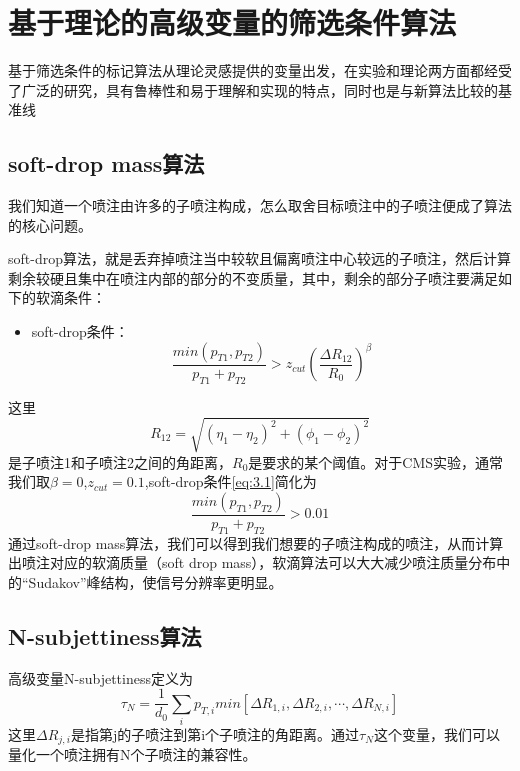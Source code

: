 \section{基于理论的高级变量的筛选条件算法}
基于筛选条件的标记算法从理论灵感提供的变量出发，在实验和理论两方面都经受了广泛的研究，具有鲁棒性和易于理解和实现的特点，同时也是与新算法比较的基准线
\subsection{soft-drop mass算法}
我们知道一个喷注由许多的子喷注构成，怎么取舍目标喷注中的子喷注便成了算法的核心问题。

soft-drop算法，就是丢弃掉喷注当中较软且偏离喷注中心较远的子喷注，然后计算剩余较硬且集中在喷注内部的部分的不变质量，其中，剩余的部分子喷注要满足如下的软滴条件：
\begin{itemize}
    \item soft-drop条件：
    \begin{equation}\label{eq:3.1}
        \frac{min(p_{T1}, p_{T2})}{p_{T1}+p_{T2}}>z_{cut} \left(\frac{\Delta R_{12}}{R_0}\right)^\beta
    \end{equation}
\end{itemize}
这里
\begin{equation}\label{eq:3.2}
    R_{12}=\sqrt{(\eta_1-\eta_2)^2+(\phi_1-\phi_2)^2}
\end{equation}
是子喷注1和子喷注2之间的角距离，$R_0$是要求的某个阈值。对于CMS实验，通常我们取$\beta=0$,$z_{cut}=0.1$,soft-drop条件\eqref{eq:3.1}简化为
\begin{equation}
    \frac{min(p_{T1}, p_{T2})}{p_{T1}+p_{T2}}>0.01
\end{equation}
通过soft-drop mass算法，我们可以得到我们想要的子喷注构成的喷注，从而计算出喷注对应的软滴质量（soft drop mass），软滴算法可以大大减少喷注质量分布中的“Sudakov”峰结构，使信号分辨率更明显。
\subsection{N-subjettiness算法}
高级变量N-subjettiness定义为
\begin{equation}
    \tau_N=\frac{1}{d_0}\sum_i p_{T,i}min\left[\Delta R_{1,i},\Delta R_{2,i},\cdots,\Delta R_{N,i}\right]
\end{equation}
这里$\Delta R_{j,i}$是指第j的子喷注到第i个子喷注的角距离。通过$\tau_N$这个变量，我们可以量化一个喷注拥有N个子喷注的兼容性。

